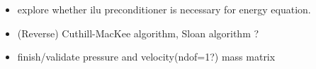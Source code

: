 
\begin{itemize}
\item explore whether ilu preconditioner is necessary for energy equation.
\item (Reverse) Cuthill-MacKee algorithm, Sloan algorithm ?
\item finish/validate pressure and velocity(ndof=1?) mass matrix 
\end{itemize}

